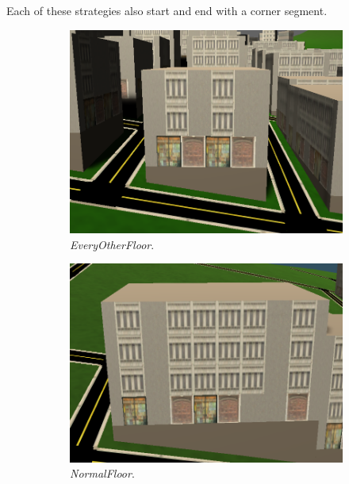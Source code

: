 Each of these strategies also start and end with a corner segment. 

\begin{figure}[H]
  \centering

  \begin{subfigure}[b]{0.3\textwidth}
    \includegraphics[width=\textwidth]{figure/building-every-other.PNG}
    \caption{\textit{EveryOtherFloor}.}
  \end{subfigure}
  \quad
  \begin{subfigure}[b]{0.3\textwidth}
    \includegraphics[width=\textwidth]{figure/building-normal.PNG}
    \caption{\textit{NormalFloor}.}
  \end{subfigure}
  \quad
  \begin{subfigure}[b]{0.3\textwidth}

\end{subfigure}
\end{figure}
